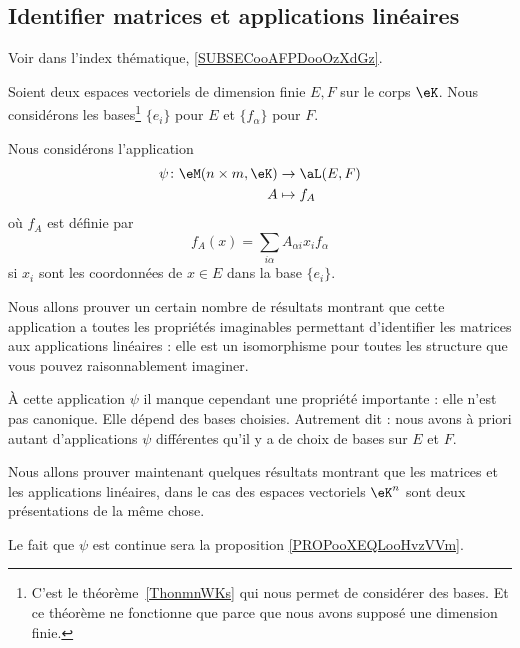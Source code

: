 \subsection{Identifier matrices et applications linéaires}

Voir dans l'index thématique, \ref{SUBSECooAFPDooOzXdGz}.

Soient deux espaces vectoriels de dimension finie \( E,F\) sur le corps \( \eK\). Nous considérons les bases\footnote{C'est le théorème~\ref{ThonmnWKs} qui nous permet de considérer des bases. Et ce théorème ne fonctionne que parce que nous avons supposé une dimension finie.} \( \{ e_i \}\) pour \( E\) et \( \{ f_{\alpha} \}\) pour \( F\). 

\begin{definition}      \label{DEFooJVOAooUgGKme}
    Nous considérons l'application
    \begin{equation}        \label{EQooVZQWooMyFFeO}
        \begin{aligned}
            \psi\colon \eM(n\times m, \eK)&\to \aL(E,F) \\
            A&\mapsto f_A 
        \end{aligned}
    \end{equation}
    où \( f_A\) est définie par
    \begin{equation}        \label{EQooBVGHooJhFbMs}
        f_A(x)=\sum_{i\alpha}A_{\alpha i}x_if_{\alpha}
    \end{equation}
    si \( x_i\) sont les coordonnées de \( x\in E\) dans la base \( \{ e_i \}\).
\end{definition}

\begin{normaltext}
    Nous allons prouver un certain nombre de résultats montrant que cette application a toutes les propriétés imaginables permettant d'identifier les matrices aux applications linéaires : elle est un isomorphisme pour toutes les structure que vous pouvez raisonnablement imaginer.

    À cette application \( \psi\) il manque cependant une propriété importante : elle n'est pas canonique. Elle dépend des bases choisies. Autrement dit : nous avons à priori autant d'applications \( \psi\) différentes qu'il y a de choix de bases sur \( E\) et \( F\).

    Nous allons prouver maintenant quelques résultats montrant que les matrices et les applications linéaires, dans le cas des espaces vectoriels \( \eK^n\) sont deux présentations de la même chose.

    Le fait que \( \psi\) est continue sera la proposition \ref{PROPooXEQLooHvzVVm}.
\end{normaltext}

